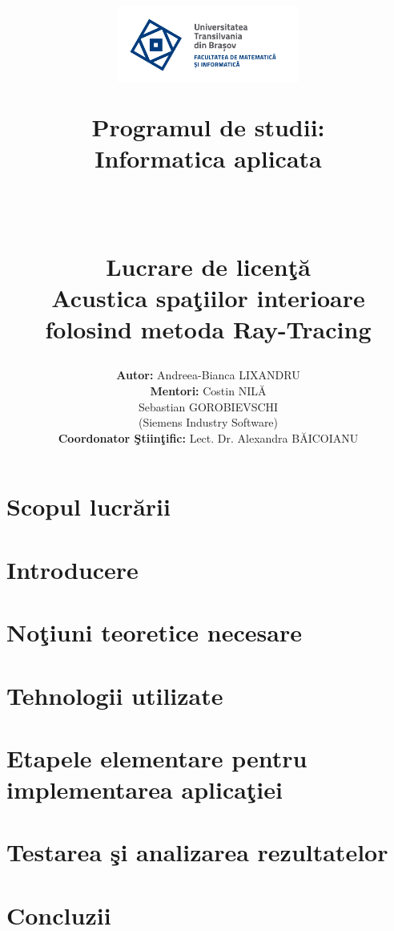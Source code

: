 \documentclass[12pt, a4paper]{report} %
\title{\begin{minipage} {0.3\textwidth}
		{{\includegraphics[width=6cm]{imagini/sigla.png} }}%
	\end{minipage}
	\hfill
	\begin{minipage}{0.3\textwidth}
		\fontsize{10pt}{6pt}\selectfont
			Programul de studii:\\
			Informatica aplicata\\
	\end{minipage}
	\vspace*{7\baselineskip}\\
	\begin{center}
			\fontsize{22pt}{6pt}\selectfont
		\bf Lucrare de licen\c{t}\u{a}\\
		\vspace{5mm}
		Acustica spa\c{t}iilor interioare folosind metoda Ray-Tracing
		\vspace*{30\baselineskip}
	\end{center}
	}
\author{\fontsize{15pt}{6pt}\selectfont
	{\bf Autor:} \hspace{5.1cm}Andreea-Bianca LIXANDRU \\
	\vspace{3mm}
	{\bf Mentori:} \hspace{4.6cm}Costin NILĂ\\
	\vspace{3mm}
	\hspace{7cm}Sebastian GOROBIEVSCHI\\
	\vspace{3mm}
	\hspace{6.9cm}(Siemens Industry Software)\\
	\vspace{3mm}
	{\bf Coordonator \c{S}tiin\c{t}ific:} \hspace{1.1cm}Lect. Dr. Alexandra BĂICOIANU}
\date{\begin{center} Bra\c{s}ov, 2021 \end{center}}
\makeatletter
\renewcommand{\maketitle}{\bgroup\setlength{\parindent}{0pt}
	\begin{flushleft}
		\textbf{\@title}
		
		\@author
		
		\vspace{10mm}
		\@date
	\end{flushleft}\egroup
}
\makeatother
\begin{document}
	
	\maketitle	
	\thispagestyle{empty} %
	
	\newpage
	\tableofcontents
	\thispagestyle{empty}

		
	
	\chapter*{Scopul lucr\u arii}
		
		
	\chapter*{Introducere}
		
	\chapter{No\c{t}iuni teoretice necesare}
		
	\chapter{Tehnologii utilizate}
		
	\chapter{Etapele elementare pentru implementarea aplica\c{t}iei}
			
	\chapter{Testarea \c{s}i analizarea rezultatelor}
		
	\chapter{Concluzii}
		
	
	
	\newpage
	
\end{document}
